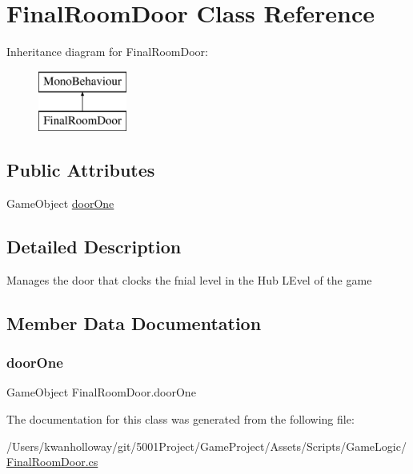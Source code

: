 \hypertarget{class_final_room_door}{}\section{Final\+Room\+Door Class Reference}
\label{class_final_room_door}
Inheritance diagram for Final\+Room\+Door\+:\begin{figure}[H]
\begin{center}
\leavevmode
\includegraphics[height=2.000000cm]{class_final_room_door}
\end{center}
\end{figure}
\subsection*{Public Attributes}
\begin{DoxyCompactItemize}
\item 
Game\+Object \hyperlink{class_final_room_door_a60613bd2f5b603777262b96ed07e87d0}{door\+One}
\end{DoxyCompactItemize}


\subsection{Detailed Description}
Manages the door that clocks the fnial level in the Hub L\+Evel of the game 

\subsection{Member Data Documentation}
\mbox{\label{class_final_room_door_a60613bd2f5b603777262b96ed07e87d0}} 
\subsubsection{\texorpdfstring{door\+One}{doorOne}}
{\footnotesize\ttfamily Game\+Object Final\+Room\+Door.\+door\+One}



The documentation for this class was generated from the following file\+:\begin{DoxyCompactItemize}
\item 
/\+Users/kwanholloway/git/5001\+Project/\+Game\+Project/\+Assets/\+Scripts/\+Game\+Logic/\hyperlink{_final_room_door_8cs}{Final\+Room\+Door.\+cs}\end{DoxyCompactItemize}
